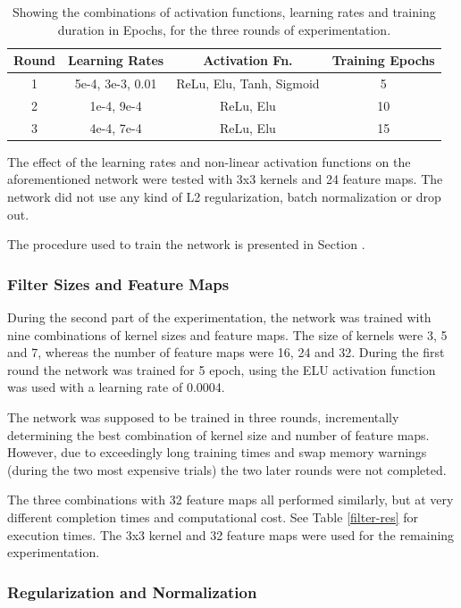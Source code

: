 \documentclass[]{article}
\begin{document}
\begin{table}[h]
	\centering
	\caption{Showing the combinations of activation functions, learning rates and training duration in Epochs, for the three rounds of experimentation.}
	\label{ac-overview}
	\begin{tabular}{@{}cccc@{}}
		\toprule
		Round & Learning Rates & Activation Fn. & Training Epochs \\ \midrule
		1 & 5e-4, 3e-3, 0.01 & ReLu, Elu, Tanh, Sigmoid & 5 \\
		2 & 1e-4, 9e-4 & ReLu, Elu & 10 \\
		3 & 4e-4, 7e-4 & ReLu, Elu & 15 \\ \bottomrule
	\end{tabular}
\end{table}

The effect of the learning rates and non-linear activation functions on the aforementioned network were tested with 3x3 kernels and 24 feature maps. The network did not use any kind of L2 regularization, batch normalization or drop out. 

The procedure used to train the network is presented in Section .

\subsubsection{Filter Sizes and Feature Maps} \label{filter-methods} 

During the second part of the experimentation, the network was trained with nine combinations of kernel sizes and feature maps. The size of kernels were 3, 5 and 7, whereas the number of feature maps were 16, 24 and 32. During the first round the network was trained for 5 epoch, using the ELU activation function was used with a learning rate of 0.0004. 

The network was supposed to be trained in three rounds, incrementally determining the best combination of kernel size and number of feature maps. However, due to exceedingly long training times and swap memory warnings (during the two most expensive trials) the two later rounds were not completed. 

The three combinations with 32 feature maps all performed similarly, but at very different completion times and computational cost. See Table \ref{filter-res} for execution times. The 3x3 kernel and 32 feature maps were used for the remaining experimentation. 

\subsubsection{Regularization and Normalization}
\end{document}

